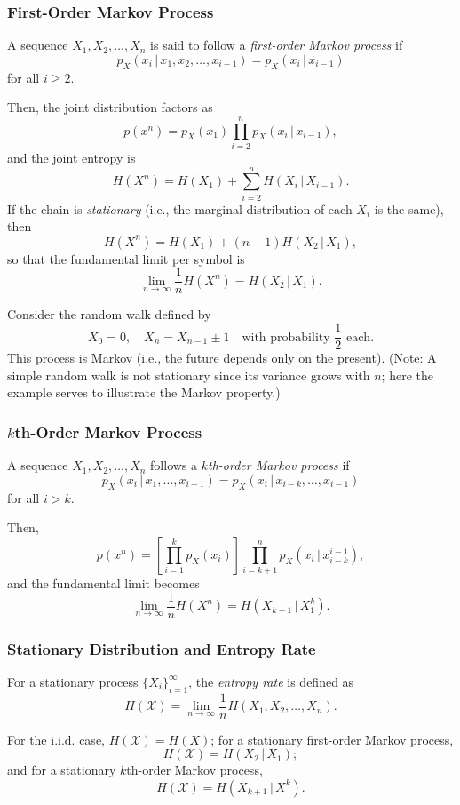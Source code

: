 \subsubsection*{First-Order Markov Process}
\begin{definition}
A sequence \(X_1, X_2, \dots, X_n\) is said to follow a \emph{first-order Markov process} if
\[
p_X(x_i\,|\, x_1,x_2,\dots,x_{i-1}) = p_X(x_i\,|\, x_{i-1})
\]
for all \(i \ge 2\).
\end{definition}
Then, the joint distribution factors as
\[
p(x^n) = p_X(x_1) \prod_{i=2}^{n} p_X(x_i \,|\, x_{i-1}),
\]
and the joint entropy is
\[
H(X^n) = H(X_1) + \sum_{i=2}^{n} H(X_i \,|\, X_{i-1}).
\]
If the chain is \emph{stationary} (i.e., the marginal distribution of each \(X_i\) is the same), then
\[
H(X^n) = H(X_1) + (n-1)H(X_2 \,|\, X_1),
\]
so that the fundamental limit per symbol is
\[
\lim_{n \to \infty} \frac{1}{n} H(X^n) = H(X_2 \,|\, X_1).
\]

\begin{example}
Consider the random walk defined by
\[
X_0 = 0,\quad X_n = X_{n-1} \pm 1 \quad \text{with probability } \frac{1}{2} \text{ each}.
\]
This process is Markov (i.e., the future depends only on the present). (Note: A simple random walk is not stationary since its variance grows with \(n\); here the example serves to illustrate the Markov property.)
\end{example}

\subsubsection*{\(k\)th-Order Markov Process}
\begin{definition}
A sequence \(X_1, X_2, \dots, X_n\) follows a \emph{\(k\)th-order Markov process} if
\[
p_X(x_i\,|\, x_1,\dots,x_{i-1}) = p_X(x_i\,|\, x_{i-k},\dots,x_{i-1})
\]
for all \(i > k\).
\end{definition}
Then,
\[
p(x^n) = \left[\prod_{i=1}^{k} p_X(x_i)\right] \prod_{i=k+1}^{n} p_X(x_i \,|\, x_{i-k}^{i-1}),
\]
and the fundamental limit becomes
\[
\lim_{n \to \infty}\frac{1}{n}H(X^n) = H(X_{k+1}\,|\, X_1^k).
\]

\subsubsection*{Stationary Distribution and Entropy Rate}
\begin{definition}
For a stationary process \(\{X_i\}_{i=1}^{\infty}\), the \emph{entropy rate} is defined as
\[
H(\mathscr{X}) = \lim_{n\to\infty} \frac{1}{n} H(X_1,X_2,\dots,X_n).
\]
\end{definition}
For the i.i.d. case, \(H(\mathscr{X})=H(X)\); for a stationary first-order Markov process,
\[
H(\mathscr{X})=H(X_2\,|\, X_1);
\]
and for a stationary \(k\)th-order Markov process,
\[
H(\mathscr{X})=H(X_{k+1}\,|\, X^k).
\]

